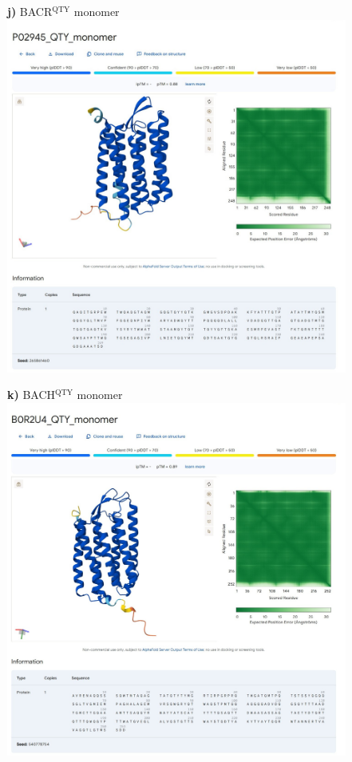 \documentclass[fleqn,12pt]{supp}
\begin{document}
\newpage
\begin{figure}[H]
    \textbf{j)} BACR$^{\textrm{QTY}}$ monomer \\
    \includegraphics[width=\linewidth]{SuppFigures/af3 bacr qty mono.jpg}
\end{figure}

\newpage
\begin{figure}[H]
    \textbf{k)} BACH$^{\textrm{QTY}}$ monomer \\
    \includegraphics[width=\linewidth]{SuppFigures/af3 bach qty mono.jpg}
\end{figure}
\end{document}
